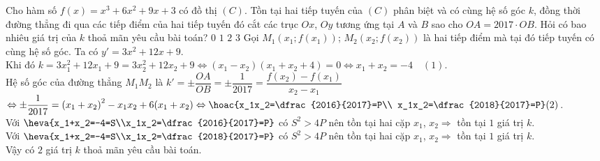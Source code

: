 \begin{ex}%
	Cho hàm số $f(x)=x^3+6x^2+9x+3$ có đồ thị $(C)$. Tồn tại hai tiếp tuyến của $(C)$ phân biệt và có cùng hệ số góc $k$, đồng thời đường thẳng đi qua các tiếp điểm của hai tiếp tuyến đó cắt các trục $Ox$, $Oy$ tương ứng tại $A$ và $B$ sao cho $OA=2017\cdot OB$. Hỏi có bao nhiêu giá trị của $k$ thoả mãn yêu cầu bài toán?
	\choice
	{$0$}
	{$1$}
	{\True $2$}
	{$3$}
	\loigiai
	{Gọi $M_1\left(x_1; f(x_1)\right)$; $M_2\left(x_2; f(x_2)\right)$ là hai tiếp điểm mà tại đó tiếp tuyến có cùng hệ số góc. Ta có $y'=3x^2+12x+9$.\\
		Khi đó $k=3x_1^2+12x_1+9=3x_2^2+12x_2+9\Leftrightarrow \left(x_1-x_2\right)\left(x_1+x_2+4\right)=0\Leftrightarrow x_1+x_2=-4 \quad (1)$.\\
		Hệ số góc của đường thẳng $M_1M_2$ là $k'=\pm \dfrac{OA}{OB}=\pm \dfrac{1}{2017}=\dfrac{f(x_2)-f(x_1)}{x_2-x_1}$\\
		$\Leftrightarrow \pm\dfrac{1}{2017}=\left(x_1+x_2\right)^2-x_1x_2+6(x_1+x_2)\Leftrightarrow \hoac{x_1x_2=\dfrac{2016}{2017}=P\\ x_1x_2=\dfrac{2018}{2017}=P} (2)$.\\
		Với $\heva{x_1+x_2=-4=S\\x_1x_2=\dfrac{2016}{2017}=P}$ có $S^2>4P$ nên tồn tại hai cặp $x_1$, $x_2\Rightarrow$ tồn tại $1$ giá trị $k$.\\
		Với $\heva{x_1+x_2=-4=S\\x_1x_2=\dfrac{2018}{2017}=P}$ có $S^2>4P$ nên tồn tại hai cặp $x_1$, $x_2\Rightarrow$ tồn tại $1$ giá trị $k$.\\
		Vậy có $2$ giá trị $k$ thoả mãn yêu cầu bài toán.
	}
\end{ex}%
